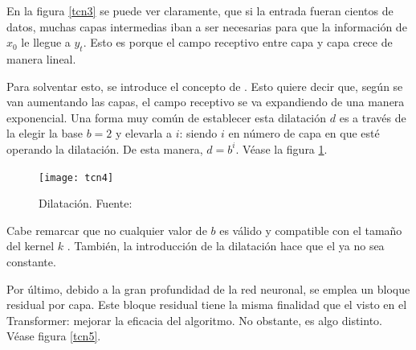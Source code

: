 En la figura \ref{tcn3} se puede ver claramente, que si la entrada fueran cientos de datos, muchas capas intermedias iban a ser necesarias para que la información de $x_0$ le llegue a $y_t$. Esto es porque el campo receptivo entre capa y capa crece de manera lineal. 

Para solventar esto, se introduce el concepto de  \parencite{waveNet}. Esto quiere decir que, según se van aumentando las capas, el campo receptivo se va expandiendo de una manera exponencial. Una forma muy común de establecer esta dilatación $d$ es a través de la elegir la base $b = 2$ y elevarla a $i$: siendo $i$ en número de capa en que esté operando la dilatación. De esta manera, $d = b^i$.  Véase la figura \ref{tcn4}.

\begin{figure}[H]
    \centering
    \hspace{-3cm}
    \texttt{[image: tcn4]}
    \caption{Dilatación. \scriptsize{Fuente: \parencite{waveNet}}}
    \label{tcn4}
\end{figure}

Cabe remarcar que no cualquier valor de $b$ es válido y compatible con el tamaño del kernel $k$ \parencite{TCNpost}. También, la introducción de la dilatación hace que el  ya no sea constante.

Por último, debido a la gran profundidad de la red neuronal, se emplea un bloque residual por capa. Este bloque residual \parencite{bloqueResidual} tiene la misma finalidad que el visto en el Transformer: mejorar la eficacia del algoritmo. No obstante, es algo distinto. Véase figura \ref{tcn5}.

